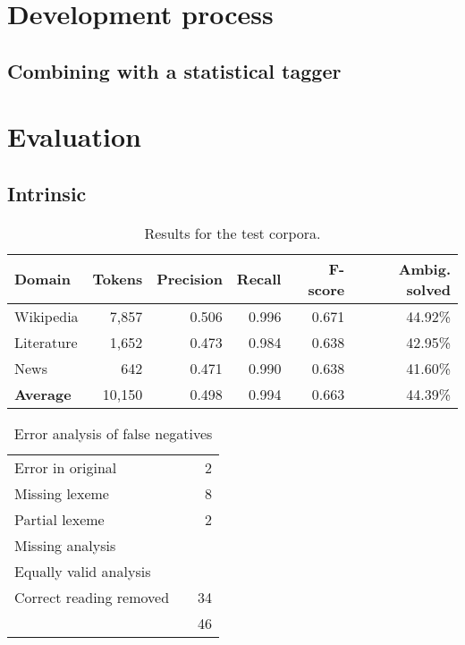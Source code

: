 \documentclass[11pt]{article}
\begin{document}
\section{Development process}

\subsection{Combining with a statistical tagger}

\section{Evaluation}

\subsection{Intrinsic}

\begin{table*}
  \centering
  \begin{tabular}{|l|r|r|r|r|r|}
    \hline
    \textbf{Domain} & \textbf{Tokens} & \textbf{Precision} & \textbf{Recall} & \textbf{F-score} & \textbf{Ambig. solved} \\
    \hline
    Wikipedia       & 7,857      & 0.506        & 0.996    & 0.671 & 44.92\%  \\
    Literature      & 1,652      & 0.473        & 0.984    & 0.638 & 42.95\%  \\
    News            & 642        & 0.471        & 0.990    & 0.638 & 41.60\%  \\
    \hline
    \textbf{Average}& 10,150     & 0.498        &  0.994   & 0.663 & 44.39\% \\
    \hline
  \end{tabular}
  \caption{Results for the test corpora.}
\end{table*}


\begin{table}
  \centering
  \begin{tabular}{|l|r|r|}
    
    \hline
    Error in original        &   & 2 \\
    Missing lexeme           &   & 8  \\          %
    Partial lexeme           &   & 2  \\          %
    Missing analysis         &   &    \\        %
    Equally valid analysis   &   &    \\   %
    Correct reading removed  &   & 34   \\ %
    \hline
                             &   & 46 \\
    \hline
  \end{tabular}
  \caption{Error analysis of false negatives}
\end{table}
\end{document}
